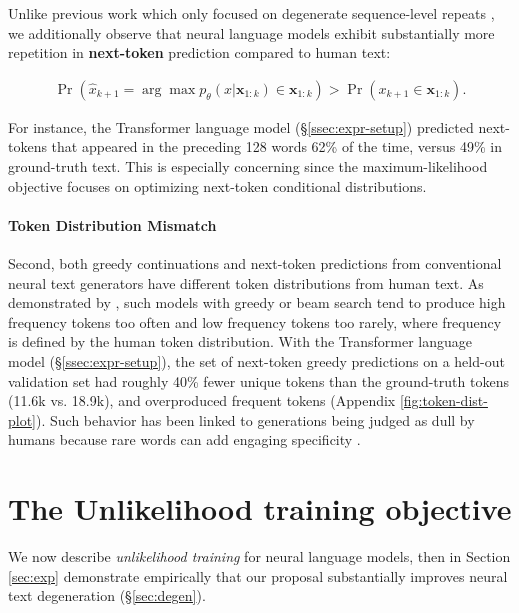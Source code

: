 Unlike previous work which only focused on degenerate sequence-level repeats \citep{holtzman2019curious}, we additionally observe that neural language models exhibit substantially more repetition in \textbf{next-token} prediction compared to human text:

\begin{align}
\label{eq:next-token-rep}
\Pr\left(\hat{x}_{k+1}=\arg\max p_{\theta}(x|\textbf{x}_{1:k})\in \textbf{x}_{1:k}\right) > \Pr\left(x_{k+1}\in \textbf{x}_{1:k}\right).
\end{align}

For instance, the Transformer language model (\S\ref{ssec:expr-setup}) predicted next-tokens that appeared in the preceding 128 words 62\% of the time, versus 49\% in ground-truth text. This is especially concerning since the maximum-likelihood objective focuses on optimizing next-token conditional distributions. 

\paragraph{Token Distribution Mismatch} 

Second, both greedy continuations and next-token predictions from conventional neural text generators have different token distributions from human text. As demonstrated by \citet{holtzman2019curious}, such models with greedy or beam search tend to produce high frequency tokens too often and low frequency tokens too rarely, where frequency is defined by the human token distribution. With the Transformer language model (\S\ref{ssec:expr-setup}), the set of next-token greedy predictions on a held-out validation set had roughly 40\% fewer unique tokens than the ground-truth tokens (11.6k vs. 18.9k), and overproduced frequent tokens (Appendix \autoref{fig:token-dist-plot}). Such behavior has been linked to generations being judged as dull by humans because rare words can add engaging specificity \citep{weston2018retrieve,see2019makes}.

\section{The Unlikelihood training objective}  
\label{sec:ul}

We now describe \textit{unlikelihood training} for neural language models, then in Section  \ref{sec:exp} demonstrate empirically that our proposal substantially improves neural text degeneration (\S\ref{sec:degen}).

